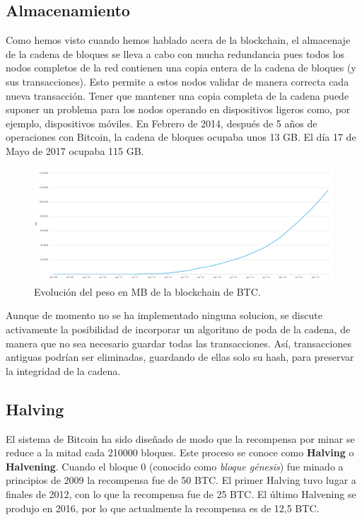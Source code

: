 \documentclass[twoside]{article}
\theoremstyle{definition}
\begin{document}
\subsection{Almacenamiento}
Como hemos visto cuando hemos hablado acera de la blockchain, el almacenaje de la cadena de bloques se lleva a cabo con mucha redundancia pues todos los nodos completos de la red contienen una copia entera de la cadena de bloques (y sus transacciones). Esto permite a estos nodos validar de manera
correcta cada nueva transacción. Tener que mantener una copia completa de la cadena puede suponer un problema para los nodos operando en dispositivos
ligeros como, por ejemplo, dispositivos móviles. En Febrero de 2014, después de 5 años de operaciones con Bitcoin, la cadena de bloques ocupaba unos 13 GB. El día 17 de Mayo de 2017 ocupaba 115 GB.
\begin{figure}[h]
\includegraphics[scale=0.45]{captura}
\captionsetup{labelformat=empty}
 \caption{Evolución del peso en MB de la blockchain de BTC.}
\end{figure}

Aunque de momento no se ha implementado ninguna solucion, se discute activamente la posibilidad de incorporar un algoritmo de poda de la cadena, de manera que no sea necesario guardar todas las transacciones. Así, transacciones antiguas podrían ser eliminadas, guardando de ellas solo su hash, para preservar la integridad de la cadena.
\newpage
\subsection{Halving}
El sistema de Bitcoin ha sido diseñado de modo que la recompensa por minar se reduce a la mitad cada 210000 bloques. Este proceso se conoce como \textbf{Halving} o \textbf{Halvening}. Cuando el bloque 0 (conocido como \emph{bloque génesis}) fue minado a principios de 2009 la recompensa fue de 50 BTC. El primer Halving tuvo lugar a finales de 2012, con lo que la recompensa fue de 25 BTC. El último Halvening se produjo en 2016, por lo que actualmente la recompensa es de 12,5 BTC. 
\end{document}
